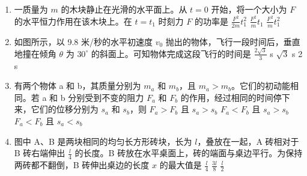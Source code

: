 \documentclass[\gkver]{gaokaozhenti}
\begin{document}
\begin{enumerate}
\item
一质量为 $m$ 的木块静止在光滑的水平面上。从 $t = 0$ 开始，将一个大小为 $F$ 的水平恒力作用在该木块上。在 $t = t_{1}$ 时刻力 $F$ 的功率是
{$\frac{F^{2}}{2m}t_{1}^{2}$}
{$\frac{F^{2}}{m}t_{1}$}
{$\frac{F^{2}}{m}t_{1}^{2}$}


\item
如图所示，以 9.8 米/秒的水平初速度 $v_{0}$ 抛出的物体，飞行一段时间后，垂直地撞在倾角 $\theta$ 为 $30^{\circ}$ 的斜面上。可知物体完成这段飞行的时间是
\onepicture[w=3.71cm]{}
{$\frac{2\sqrt{3}}{3}$ s}
{$\sqrt{3}$ s}
{2 s}


\item
有两个物体 a 和 b，其质量分别为 $m_{a}$ 和 $m_{b}$，且 $m_{a} > m_{b}$。它们的初动能相同。若 a 和 b 分别受到不变的阻力 $F_{a}$ 和 $F_{b}$ 的作用，经过相同的时间停下来，它们的位移分别为 $s_{a}$ 和 $s_{b}$，则
{$F_{a} > F_{b}$ 且 $s_{a} > s_{b}$}
{$F_{a} < F_{b}$ 且 $s_{a} > s_{b}$}
{$F_{a} < F_{b}$ 且 $s_{a} < s_{b}$}


\item
图中 A、B 是两块相同的均匀长方形砖块，长为 $l$，叠放在一起，A 砖相对于 B 砖右端伸出 $\frac{l}{4}$ 的长度。B 砖放在水平桌面上，砖的端面与桌边平行。为保持两砖都不翻倒，B 砖伸出桌边的长度 $x$ 的最大值是
\onepicture[w=4.82cm]{}
{$\frac{l}{4}$}
{$\frac{3l}{8}$}
{$\frac{l}{2}$}


\end{enumerate}
\end{document}
